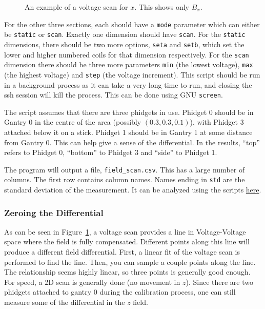 \documentclass[twoside,letterpaper]{refart}
\begin{document}
\begin{figure}[!htb]\centering
  \resizebox{\textwidth}{!}{}
  \caption{An example of a voltage scan for \(x\). This shows only \(B_x\).\label{fig:vScan}}
\end{figure}

For the other three sections, each should have a \texttt{mode} parameter which can either be \texttt{static} or \texttt{scan}. Exactly one dimension should have \texttt{scan}. For the \texttt{static} dimensions, there should be two more options, \texttt{seta} and \texttt{setb}, which set the lower and higher numbered coils for that dimension respectively. For the \texttt{scan} dimension there should be three more parameters \texttt{min} (the lowest voltage), \texttt{max} (the highest voltage) and \texttt{step} (the voltage increment). This script should be run in a background process as it can take a very long time to run, and closing the ssh session will kill the process. This can be done using GNU \texttt{screen}.

The script assumes that there are three phidgets in use. Phidget 0 should be in Gantry 0 in the centre of the area (possibly \((0.3,0.3,0.1)\)), with Phidget 3 attached below it on a stick. Phidget 1 should be in Gantry 1 at some distance from Gantry 0. This can help give a sense of the differential. In the results, ``top'' refers to Phidget 0, ``bottom'' to Phidget 3 and ``side'' to Phidget 1.

The program will output a file, \texttt{field\_scan.csv}. This has a large number of columns. The first row contains column names. Names ending in \texttt{std} are the standard deviation of the measurement. It can be analyzed using the scripts \href{bitbucket.com/}{here}.

\subsubsection{Zeroing the Differential}

As can be seen in Figure~\ref{fig:vScan}, a voltage scan provides a line in Voltage-Voltage space where the field is fully compensated. Different points along this line will produce a different field differential. First, a linear fit of the voltage scan is performed to find the line. Then, you can sample a couple points along the line. The relationship seems highly linear, so three points is generally good enough. For speed, a 2D scan is generally done (no movement in \(z\)). Since there are two phidgets attached to gantry 0 during the calibration process, one can still measure some of the differential in the \(z\) field.
\end{document}
